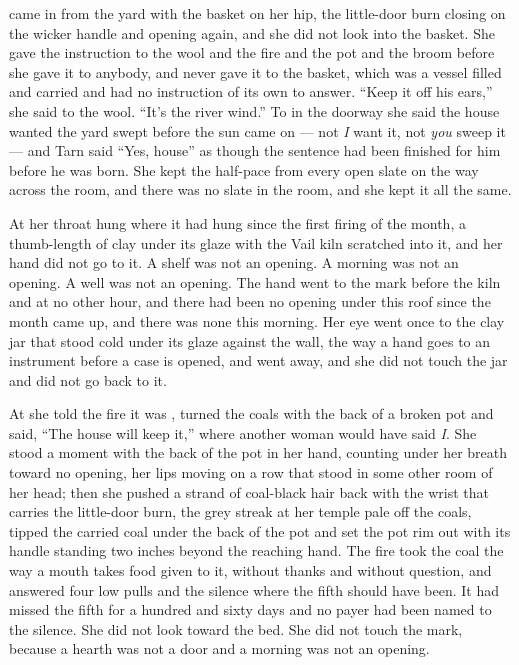\scenebreak

 came in from the yard with the basket on her hip, the little-door burn closing on the wicker handle and opening again, and she did not look into the basket. She gave the instruction to the wool and the fire and the pot and the broom before she gave it to anybody, and never gave it to the basket, which was a vessel filled and carried and had no instruction of its own to answer. “Keep it off his ears,” she said to the wool. “It's the river wind.” To  in the doorway she said the house wanted the yard swept before the sun came on  --- not \emph{I} want it, not \emph{you} sweep it --- and Tarn said “Yes, house” as though the sentence had been finished for him before he was born. She kept the half-pace from every open slate on the way across the room, and there was no slate in the room, and she kept it all the same.

At her throat  hung where it had hung since the first firing of the month, a thumb-length of clay under its glaze with the Vail kiln scratched into it, and her hand did not go to it. A shelf was not an opening. A morning was not an opening. A well was not an opening. The hand went to the mark before the kiln and at no other hour, and there had been no opening under this roof since the month came up, and there was none this morning. Her eye went once to the clay jar that stood cold under its glaze against the wall, the way a hand goes to an instrument before a case is opened, and went away, and she did not touch the jar and did not go back to it.

At  she told the fire it was , turned the coals with the back of a broken pot and said, “The house will keep it,” where another woman would have said \emph{I}. She stood a moment with the back of the pot in her hand, counting under her breath toward no opening, her lips moving on a row that stood in some other room of her head; then she pushed a strand of coal-black hair back with the wrist that carries the little-door burn, the grey streak at her temple pale off the coals, tipped the carried coal under the back of the pot and set the pot rim out with its handle standing two inches beyond the reaching hand. The fire took the coal the way a mouth takes food given to it, without thanks and without question, and answered four low pulls and the silence where the fifth should have been. It had missed the fifth for a hundred and sixty days and no payer had been named to the silence. She did not look toward the bed. She did not touch the mark, because a hearth was not a door and a morning was not an opening.


